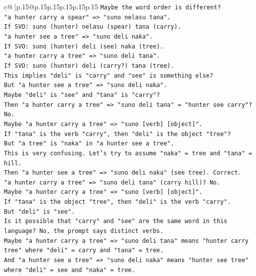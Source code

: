 \documentclass{article}
\begin{document}
{\begin{supertabular}{c@{$\;$}|p{.15\linewidth}@{}p{.15\linewidth}p{.15\linewidth}p{.15\linewidth}p{.15\linewidth}p{.15\linewidth}}
{{{\texttt{Maybe the word order is different?} \\
\texttt{"a hunter carry a spear" => "suno nelasu tana".} \\
\texttt{If SVO: suno (hunter) nelasu (spear) tana (carry).} \\
\texttt{"a hunter see a tree" => "suno deli naka".} \\
\texttt{If SVO: suno (hunter) deli (see) naka (tree).} \\
\texttt{"a hunter carry a tree" => "suno deli tana".} \\
\texttt{If SVO: suno (hunter) deli (carry?) tana (tree).} \\
\texttt{This implies "deli" is "carry" and "see" is something else?} \\
\texttt{But "a hunter see a tree" => "suno deli naka".} \\
\texttt{Maybe "deli" is "see" and "tana" is "carry"?} \\
\texttt{Then "a hunter carry a tree" => "suno deli tana" = "hunter see carry"? No.} \\
\texttt{Maybe "a hunter carry a tree" => "suno {[}verb{]} {[}object{]}".} \\
\texttt{If "tana" is the verb "carry", then "deli" is the object "tree"?} \\
\texttt{But "a tree" is "naka" in "a hunter see a tree".} \\
\texttt{This is very confusing. Let's try to assume "naka" = tree and "tana" = hill.} \\
\texttt{Then "a hunter see a tree" => "suno deli naka" (see tree). Correct.} \\
\texttt{"a hunter carry a tree" => "suno deli tana" (carry hill)? No.} \\
\texttt{Maybe "a hunter carry a tree" => "suno {[}verb{]} {[}object{]}".} \\
\texttt{If "tana" is the object "tree", then "deli" is the verb "carry".} \\
\texttt{But "deli" is "see".} \\
\texttt{Is it possible that "carry" and "see" are the same word in this language? No, the prompt says distinct verbs.} \\
\texttt{Maybe "a hunter carry a tree" => "suno deli tana" means "hunter carry tree" where "deli" = carry and "tana" = tree.} \\
\texttt{And "a hunter see a tree" => "suno deli naka" means "hunter see tree" where "deli" = see and "naka" = tree.} \\
}}}
\end{supertabular}}
\end{document}
